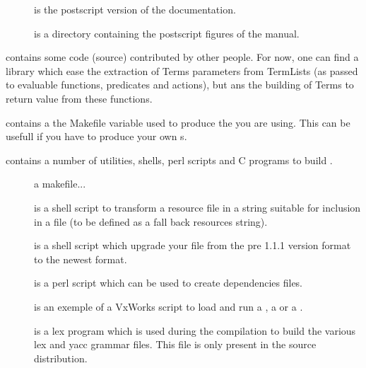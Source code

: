 \begin{description}
\begin{description}
\item [] is the postscript version of the documentation.

\item [] is a directory containing the postscript figures of the
manual.

\end{description}

\item [\file{contrib}] contains some code (source) contributed by other people.
For now, one can find a library which ease the extraction of Terms parameters
from TermLists (as passed to evaluable functions, predicates and actions), but
ans the building of Terms to return value from these functions.

\item [\file{site.make}] contains a the Makefile variable used to produce the
\COPRSDE{} you are using. This can be usefull if you have to produce your own
\PK{}s.

\item [\file{util}] contains a number of utilities, shells, perl scripts and C
programs to build \COPRS{}.

\begin{description}

\item [] a makefile...

\item [] is a shell script to transform a  resource file
in a string suitable for inclusion in a  file (to be defined as a
fall back resources string).

\item [] is a shell script which upgrade your 
file from the pre 1.1.1 version format to the newest format.

\item [] is a perl script which can be used to create dependencies
files.

\item [] is an exemple of a VxWorks script to load and run a
\CPK{}, a \MPA{} or a \MPK{}.

\item [] is a lex program which is used during the \COPRS{}
compilation to build the various lex and yacc grammar files. This file is only
present in the source distribution.

\end{description}


\end{description}

